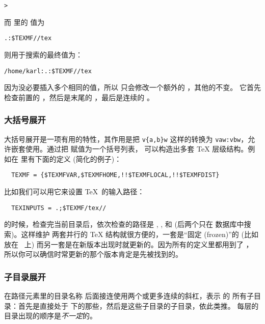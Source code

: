 \documentclass{article}
\begin{document}
\begin{alltt}
> 
\end{alltt}

而  里的  值为

\begin{alltt}
  .:\$TEXMF//tex
\end{alltt}

则用于搜索的最终值为：

\begin{alltt}
  /home/karl:.:\$TEXMF//tex
\end{alltt}

因为没必要插入多个相同的值，所以 \KPS{} 只会修改一个额外的 \samp{:}，其他的不变。
它首先检查前置的 \samp{:}，然后是末尾的 \samp{:}，最后是连续的 \samp{:}。

\subsubsection{大括号展开}
\label{sec:brace-expansion}

大括号展开是一项有用的特性，其作用是把 \verb+v{a,b}w+ 这样的转换为
\verb+vaw:vbw+，允许嵌套使用。通过把  赋值为一个括号列表，
可以构造出多套 \TeX{} 层级结构。例如在  里有下面的定义
(简化的例子)：
\begin{verbatim}
  TEXMF = {$TEXMFVAR,$TEXMFHOME,!!$TEXMFLOCAL,!!$TEXMFDIST}
\end{verbatim}
比如我们可以用它来设置 \TeX\ 的输入路径：
\begin{verbatim}
  TEXINPUTS = .;$TEXMF/tex//
\end{verbatim}
的时候，检查完当前目录后，依次检查的路径是
, , 
和  (后两个只在  数据库中搜索)。这样维护
两套并行的 \TeX{} 结构就很方便的，一套是``固定 (frozen)''的 (比如放在 \CD\ 上)
而另一套是在新版本出现时就更新的。因为所有的定义里都用到了 ，
所以你可以确信时常更新的那个版本肯定是先被找到的。

\subsubsection{子目录展开}
\label{sec:subdirectory-expansion}

在路径元素里的目录名称  后面接连使用两个或更多连续的斜杠，表示  的
所有子目录：首先是直接处于  下的那些，然后是这些子目录的子目录，依此类推。
每层的目录出现的顺序是\emph{不一定}的。
\end{document}
